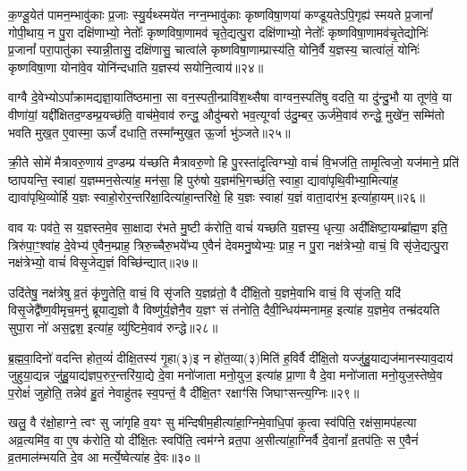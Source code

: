 क॒ण्डू॒येत॑ पामन॒म्भावु॑काः प्र॒जाः स्यु॒र्यथ्स्मये॑त नग्न॒म्भावु॑काः कृष्णविषा॒णया॑ कण्डूयते\-ऽपि॒गृह्य॑ स्मयते प्र॒जानां᳚ गोपी॒थाय॒ न पु॒रा दक्षि॑णाभ्यो॒ नेतोः᳚ कृष्णविषा॒णामव॑ चृते॒द्यत्पु॒रा दक्षि॑णाभ्यो॒ नेतोः᳚ कृष्णविषा॒णामव॑चृ॒तेद्योनिः॑ प्र॒जानां᳚ परा॒पातु॑का स्यान्नी॒तासु॒ दक्षि॑णासु॒ चात्वा॑ले कृष्णविषा॒णाम्प्रास्य॑ति॒ योनि॒र्वै य॒ज्ञस्य॒ चात्वा॑लं॒ योनिः॑ कृष्णविषा॒णा योना॑वे॒व योनि॑न्दधाति य॒ज्ञस्य॑ सयोनि॒त्वाय॑॥२४॥

{\anuvakamend[{रु॒न्ध॒ ए॒ष तस्मा᳚च्छर॒मयी॒ यूप॒स्तृती॑यम्मिथुन॒त्वाय॒ जन्म॒ हस्ते॑ना॒ष्टाच॑त्वारिꣳशच्च॥३॥}]}

वाग्वै दे॒वेभ्यो\-ऽपा᳚क्रामद्यज्ञा॒याति॑ष्ठमाना॒ सा वन॒स्पती॒न्प्रावि॑श॒थ्सैषा वाग्वन॒स्पति॑षु वदति॒ या दु॑न्दु॒भौ या तूण॑वे॒ या वीणा॑यां॒ यद्दी᳚क्षितद॒ण्डम्प्र॒यच्छ॑ति॒ वाच॑मे॒वाव॑ रुन्द्ध॒ औदु॑म्बरो भव॒त्यूर्ग्वा उ॑दु॒म्बर॒ ऊर्ज॑मे॒वाव॑ रुन्द्धे॒ मुखे॑न॒ सम्मि॑तो भवति मुख॒त ए॒वास्मा॒ ऊर्जं॑ दधाति॒ तस्मा᳚न्मुख॒त ऊ॒र्जा भु॑ञ्जते॥२५॥

क्री॒ते सोमे॑ मैत्रावरु॒णाय॑ द॒ण्डम्प्र य॑च्छति मैत्रावरु॒णो हि पु॒रस्ता॑दृ॒त्विग्भ्यो॒ वाचं॑ वि॒भज॑ति॒ तामृ॒त्विजो॒ यज॑माने॒ प्रति॑ ष्ठापयन्ति॒ स्वाहा॑ य॒ज्ञम्मन॒सेत्या॑ह॒ मन॑सा॒ हि पुरु॑षो य॒ज्ञम॑भि॒गच्छ॑ति॒ स्वाहा॒ द्यावा॑पृथि॒वीभ्या॒मित्या॑ह॒ द्यावा॑पृथि॒व्योर्\mbox{}हि य॒ज्ञः स्वाहो॒रोर॒न्तरि॑क्षा॒दित्या॑हा॒न्तरि॑क्षे॒ हि य॒ज्ञः स्वाहा॑ य॒ज्ञं वाता॒दार॑भ॒ इत्या॑हा॒यम्॥२६॥

वाव यः पव॑ते॒ स य॒ज्ञस्तमे॒व सा॒क्षादा र॑भते मु॒ष्टी क॑रोति॒ वाचं॑ यच्छति य॒ज्ञस्य॒ धृत्या॒ अदी᳚क्षिष्टा॒यम्ब्रा᳚ह्म॒ण इति॒ त्रिरु॑पा॒ꣳ॒श्वा॑ह दे॒वेभ्य॑ ए॒वैन॒म्प्राह॒ त्रिरु॒च्चैरु॒भये᳚भ्य ए॒वैनं॑ देवमनु॒ष्येभ्यः॒ प्राह॒ न पु॒रा नक्ष॑त्रेभ्यो॒ वाचं॒ वि सृ॑जे॒द्यत्पु॒रा नक्ष॑त्रेभ्यो॒ वाचं॑ विसृ॒जेद्य॒ज्ञं विच्छि॑न्द्यात्॥२७॥

उदि॑तेषु॒ नक्ष॑त्रेषु व्र॒तं कृ॑णु॒तेति॒ वाचं॒ वि सृ॑जति य॒ज्ञव्र॑तो॒ वै दी᳚क्षि॒तो य॒ज्ञमे॒वाभि वाचं॒ वि सृ॑जति॒ यदि॑ विसृ॒जेद्वै᳚ष्ण॒वीमृच॒मनु॑ ब्रूयाद्य॒ज्ञो वै विष्णु॑र्य॒ज्ञेनै॒व य॒ज्ञꣳ सं त॑नोति॒ दैवी॒न्धिय॑म्मनामह॒ इत्या॑ह य॒ज्ञमे॒व तन्म्र॑दयति सुपा॒रा नो॑ अस॒द्वश॒ इत्या॑ह॒ व्यु॑ष्टिमे॒वाव॑ रुन्द्धे॥२८॥

ब्र॒ह्म॒वा॒दिनो॑ वदन्ति होत॒व्यं॑ दीक्षि॒तस्य॑ गृ॒हा(३)इ न हो॑त॒व्या(३)मिति॑ ह॒विर्वै दी᳚क्षि॒तो यज्जु॑हु॒याद्यज॑मानस्याव॒दाय॑ जुहुया॒द्यन्न जु॑हु॒याद्य॑ज्ञप॒रुर॒न्तरि॑या॒द्ये दे॒वा मनो॑जाता मनो॒युज॒ इत्या॑ह प्रा॒णा वै दे॒वा मनो॑जाता मनो॒युज॒स्तेष्वे॒व प॒रोक्षं॑ जुहोति॒ तन्नेव॑ हु॒तं नेवाहु॑तꣴ स्व॒पन्तं॒ वै दी᳚क्षि॒तꣳ रक्षाꣳ॑सि जिघाꣳसन्त्य॒ग्निः॥२९॥

खलु॒ वै र॑क्षो॒हाग्ने॒ त्वꣳ सु जा॑गृहि व॒यꣳ सु म॑न्दिषीम॒हीत्या॑हा॒ग्निमे॒वाधि॒पां कृ॒त्वा स्व॑पिति॒ रक्ष॑सा॒मप॑हत्या अव्र॒त्यमि॑व॒ वा ए॒ष क॑रोति॒ यो दी᳚क्षि॒तः स्वपि॑ति॒ त्वम॑ग्ने व्रत॒पा अ॒सीत्या॑हा॒ग्निर्वै दे॒वानां᳚ व्र॒तप॑तिः॒ स ए॒वैनं॑ व्र॒तमाल॑म्भयति दे॒व आ मर्त्ये॒ष्वेत्या॑ह दे॒वः॥३०॥


